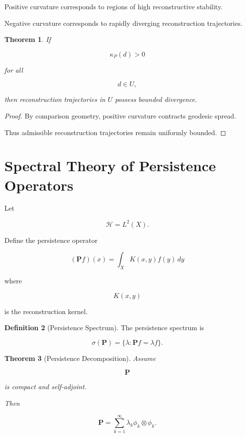 \documentclass[12pt,oneside]{article}
\newtheorem{theorem}{Theorem}[section] \newtheorem{lemma}[theorem]{Lemma} \newtheorem{proposition}[theorem]{Proposition} \newtheorem{corollary}[theorem]{Corollary}
\theoremstyle{definition}
\newtheorem{definition}[theorem]{Definition} \newtheorem{axiom}[theorem]{Axiom} \newtheorem{remark}[theorem]{Remark} \newtheorem{example}[theorem]{Example}
\begin{document}
Positive curvature corresponds to regions of high reconstructive stability.

Negative curvature corresponds to rapidly diverging reconstruction trajectories.

\begin{theorem}

If

\[
\kappa_P(d)>0
\]

for all

\[
d\in U,
\]

then reconstruction trajectories in \(U\) possess bounded divergence.

\end{theorem}

\begin{proof}

By comparison geometry,
positive curvature contracts geodesic spread.

Thus admissible reconstruction trajectories remain uniformly bounded.

\end{proof}

\section{Spectral Theory of Persistence Operators}

Let

\[
\mathcal H
=
L^2(X).
\]

Define the persistence operator

\[
(\mathbf P f)(x)
=
\int_X
K(x,y)
f(y)\,dy
\]

where

\[
K(x,y)
\]

is the reconstruction kernel.

\begin{definition}[Persistence Spectrum]

The persistence spectrum is

\[
\sigma(\mathbf P)
=
\{
\lambda:
\mathbf P f
=
\lambda f
\}.
\]

\end{definition}

\begin{theorem}[Persistence Decomposition]

Assume

\[
\mathbf P
\]

is compact and self-adjoint.

Then

\[
\mathbf P
=
\sum_{k=1}^{\infty}
\lambda_k
\phi_k
\otimes
\phi_k.
\]

\end{theorem}
\end{document}
